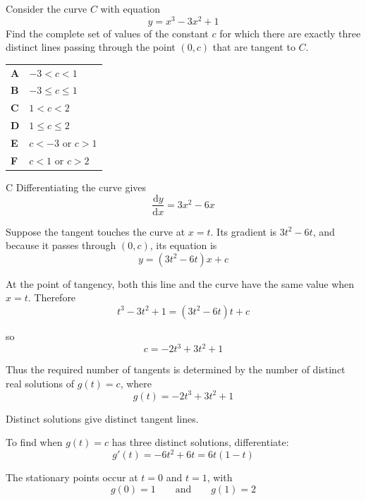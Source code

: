 \documentclass[11pt,a4paper]{article}
\begin{document}
\vspace*{8pt}
\begin{enumerate}[label=\textbf{\arabic*.},leftmargin=*,itemsep=0pt,start=16]
\questionitem[Polynomials]
Consider the curve $C$ with equation \[y = x^3 - 3x^2 + 1\]
Find the complete set of values of the constant $c$ for which there are exactly three distinct lines passing through the point $(0, c)$ that are tangent to $C$.

\par\vspace*{12pt}
\begin{tabularx}{\linewidth}{@{}>{\bfseries}l Y@{}}
A &
$-3 < c < 1$
\\[0.8em]
B &
$-3 \le c \le 1$
\\[0.8em]
C &
$1 < c < 2$
\\[0.8em]
D &
$1 \le c \le 2$
\\[0.8em]
E &
$c < -3$ or $c > 1$
\\[0.8em]
F &
$c < 1$ or $c > 2$
\\
\end{tabularx}

\begin{djsSolution}{C}
Differentiating the curve gives
\[
\frac{\mathrm{d}y}{\mathrm{d}x}=3x^2-6x
\]

Suppose the tangent touches the curve at $x=t$. Its gradient is $3t^2-6t$, and because it passes through $(0,c)$, its equation is
\[
y=(3t^2-6t)x+c
\]

At the point of tangency, both this line and the curve have the same value when $x=t$. Therefore
\[
t^3-3t^2+1=(3t^2-6t)t+c
\]

so
\[
c=-2t^3+3t^2+1
\]

Thus the required number of tangents is determined by the number of distinct real solutions of $g(t)=c$, where
\[
g(t)=-2t^3+3t^2+1
\]

Distinct solutions give distinct tangent lines.

To find when $g(t)=c$ has three distinct solutions, differentiate:
\[
g'(t)=-6t^2+6t=6t(1-t)
\]

The stationary points occur at $t=0$ and $t=1$, with
\[
g(0)=1 \qquad\text{and}\qquad g(1)=2
\]


\end{djsSolution}
\end{enumerate}
\end{document}
